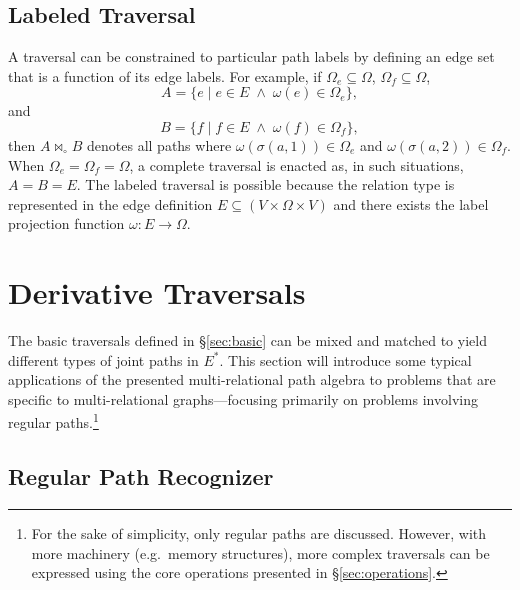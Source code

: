 \documentclass[10pt,conference,letterpaper]{IEEEtran}
\newcommand{\rar}{\rightarrow}
\newcommand{\join}{\bowtie_\circ}
\begin{document}
\subsection{Labeled Traversal}

A traversal can be constrained to particular path labels by defining an edge set that is a function of its edge labels. For example, if $\Omega_e \subseteq \Omega$, $\Omega_f \subseteq \Omega$,
\begin{equation*}
A = \{ e \; | \; e \in E \; \wedge \; \omega(e) \in \Omega_e \},
\end{equation*}
and
\begin{equation*}
B = \{ f \; | \; f \in E \; \wedge \; \omega(f) \in \Omega_f \},
\end{equation*}
then $A \join B$ denotes all paths where $\omega(\sigma(a,1)) \in \Omega_e$ and $\omega(\sigma(a,2)) \in \Omega_f$. When $\Omega_e = \Omega_f = \Omega$, a complete traversal is enacted as, in such situations, $A = B = E$. The labeled traversal is possible because the relation type is represented in the edge definition $E \subseteq (V \times \Omega \times V)$ and there exists the label projection function $\omega: E \rar \Omega$. 

\section{Derivative Traversals\label{sec:derivative}}

The basic traversals defined in \S \ref{sec:basic} can be mixed and matched to yield different types of joint paths in $E^*$. This section will introduce some typical applications of the presented multi-relational path algebra to problems that are specific to multi-relational graphs---focusing primarily on problems involving regular paths.\footnote{For the sake of simplicity, only regular paths are discussed. However, with more machinery (e.g.~memory structures), more complex traversals can be expressed using the core operations presented in \S \ref{sec:operations}.}

\subsection{Regular Path Recognizer\label{sec:recognizer}}
\end{document}
